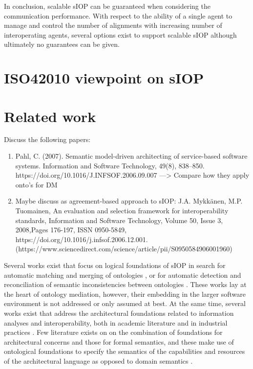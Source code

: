 \documentclass[sort&compress,preprint,authoryear,3p,twocolumn]{elsarticle}
\begin{document}
In conclusion, scalable sIOP can be guaranteed when considering the
communication performance. With respect to the ability of a single agent
to manage and control the number of alignments with increasing number of
interoperating agents, several options exist to support scalable sIOP
although ultimately no guarantees can be given.

\hypertarget{iso42010-viewpoint-on-siop}{%
\section{ISO42010 viewpoint on sIOP}\label{iso42010-viewpoint-on-siop}}

\hypertarget{related-work}{%
\section{Related work}\label{related-work}}

Discuss the following papers:

\begin{enumerate}
\def\labelenumi{\arabic{enumi}.}
\item
  Pahl, C. (2007). Semantic model-driven architecting of service-based
  software systems. Information and Software Technology, 49(8),
  838--850. https://doi.org/10.1016/J.INFSOF.2006.09.007
  ---\textgreater{} Compare how they apply onto's for DM
\item
  Maybe discuss as agreement-based approach to sIOP: J.A. Mykkänen, M.P.
  Tuomainen, An evaluation and selection framework for interoperability
  standards, Information and Software Technology, Volume 50, Issue 3,
  2008,Pages 176-197, ISSN 0950-5849,
  https://doi.org/10.1016/j.infsof.2006.12.001.
  (https://www.sciencedirect.com/science/article/pii/S0950584906001960)
\end{enumerate}

Several works exist that focus on logical foundations of sIOP in search
for automatic matching and merging of ontologies
\citep{Euzenat:2013ie, Benedikt2018a, Scharffe2014}, or for automatic
detection and reconciliation of semantic inconsistencies between
ontologies \citep{Fahad2012, Diggelen:2007vd}. These works lay at the
heart of ontology mediation, however, their embedding in the larger
software environment is not addressed or only assumed at best. At the
same time, several works exist that address the architectural
foundations related to information analyses and interoperability, both
in academic literature \citep{Karagiannis2006, Raghupathi2008} and in
industrial practices \citep{ObjectManagementGroupOMG2013}. Few
literature exists on on the combination of foundations for architectural
concerns and those for formal semantics, and these make use of
ontological foundations to specify the semantics of the capabilities and
resources of the architectural language as opposed to domain semantics
\citep{Naudet2010, Azevedo2015, Carvalho2016}.
\end{document}
